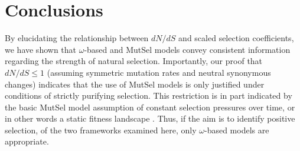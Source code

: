 \documentclass[11pt]{article}
\begin{document}






\section*{Conclusions}
By elucidating the relationship between $dN/dS$ and scaled selection coefficients, we have shown that $\omega$-based and MutSel models convey consistent information regarding the strength of natural selection. Importantly, our proof that $dN/dS \leq 1$ (assuming symmetric mutation rates and neutral synonymous changes) indicates that the use of MutSel models is only justified under conditions of strictly purifying selection. This restriction is in part indicated by the basic MutSel model assumption of constant selection pressures over time, or in other words a static fitness landscape \cite{HalpernBruno1998,Thorneetal2007,Rodrigueetal2010,Thorne2012}. Thus, if the aim is to identify positive selection, of the two frameworks examined here, only $\omega$-based models are appropriate. 
\end{document}
